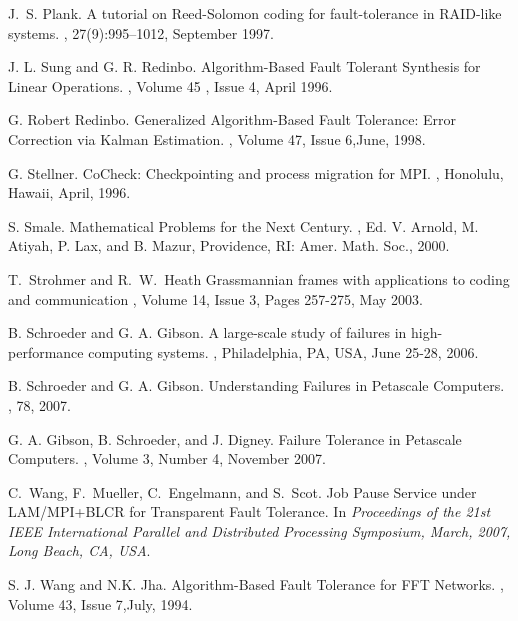 \documentclass{sig-alternate}
\begin{document}
\begin{thebibliography}{14}
\vfill \eject



J.~S. Plank.
\newblock A tutorial on {R}eed-{S}olomon coding for fault-tolerance in
  {RAID}-like systems.
, 27(9):995--1012, September
  1997.




J. L. Sung and G. R. Redinbo.
\newblock Algorithm-Based Fault Tolerant Synthesis for Linear Operations.
, 
Volume 45 ,  Issue 4, April 1996.

G. Robert Redinbo.
\newblock Generalized Algorithm-Based Fault Tolerance: Error Correction via Kalman Estimation.
, 
Volume 47,  Issue 6,June, 1998.

G. Stellner.
\newblock CoCheck: Checkpointing and process migration for MPI.
, 
Honolulu, Hawaii, April, 1996.


S. Smale.
\newblock Mathematical Problems for the Next Century.
, 
Ed. V. Arnold, M. Atiyah, P. Lax, and B. Mazur, Providence, RI: Amer. Math. Soc., 2000. 


T.~Strohmer and R.~W.~Heath
\newblock Grassmannian frames with applications to coding and communication 
, Volume 14, Issue 3, Pages 257-275, May 2003.

B. Schroeder and G. A. Gibson.
\newblock A large-scale study of failures in high-performance computing systems.
, Philadelphia, PA, USA,  June 25-28, 2006.

B. Schroeder and G. A. Gibson.
\newblock Understanding Failures in Petascale Computers.
, 78, 2007.

G. A. Gibson, B. Schroeder, and J. Digney.
\newblock Failure Tolerance in Petascale Computers.
, Volume 3, Number 4, November 2007.



C.~Wang, F.~Mueller, C.~Engelmann, and S.~Scot.
\newblock Job Pause Service under LAM/MPI+BLCR for Transparent Fault Tolerance.
\newblock In {\em Proceedings of the 21st IEEE International Parallel and 
Distributed Processing Symposium, March, 2007, Long Beach, CA, USA}.

S. J. Wang and N.K.  Jha.
\newblock Algorithm-Based Fault Tolerance for FFT Networks.
, 
Volume 43,  Issue 7,July, 1994.



\end{thebibliography}
\end{document}
